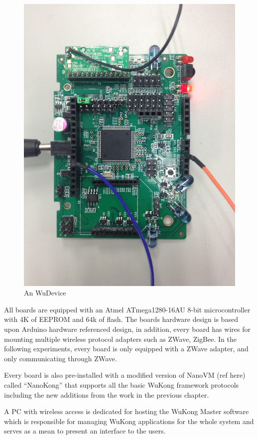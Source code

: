 \begin{figure}[h!]
\caption{An WuDevice}
\label{fig:wudevice}
\centering
    \includegraphics[width=\linewidth]{figures/wudevice}
\end{figure}

All boards are equipped with an Atmel ATmega1280-16AU 8-bit microcontroller with 4K of EEPROM and 64k of flash. The boards hardware design is based upon Arduino hardware referenced design, in addition, every board has wires for mounting multiple wireless protocol adapters such as ZWave, ZigBee. In the following experiments, every board is only equipped with a ZWave adapter, and only communicating through ZWave. 

Every board is also pre-installed with a modified version of NanoVM (ref here) called “NanoKong” that supports all the basic WuKong framework protocols including the new additions from the work in the previous chapter.

A PC with wireless access is dedicated for hosting the WuKong Master software which is responsible for managing WuKong applications for the whole system and serves as a mean to present an interface to the users.

